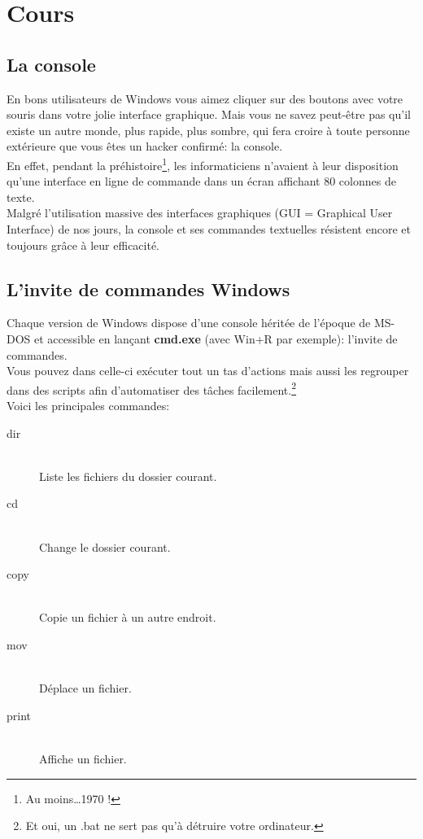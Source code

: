 \section{Cours}

\subsection{La console}
En bons utilisateurs de Windows vous aimez cliquer sur des boutons avec votre
souris dans votre jolie interface graphique. Mais vous ne savez peut-être pas
qu'il existe un autre monde, plus rapide, plus sombre, qui fera croire à toute
personne extérieure que vous êtes un hacker confirmé: la console.\\
En effet, pendant la préhistoire\footnote{Au moins\ldots 1970 !}, les
informaticiens n'avaient à leur disposition qu'une interface en ligne de
commande dans un écran affichant 80 colonnes de texte.\\
Malgré l'utilisation massive des interfaces graphiques (GUI = Graphical User
Interface) de nos jours, la console et ses commandes textuelles résistent encore
et toujours grâce à leur efficacité.

\subsection{L'invite de commandes Windows}
Chaque version de Windows dispose d'une console héritée de l'époque de MS-DOS
et accessible en lançant \textbf{cmd.exe} (avec Win+R par exemple): l'invite de
commandes.\\
Vous pouvez dans celle-ci exécuter tout un tas d'actions mais aussi les
regrouper dans des scripts afin d'automatiser des tâches
facilement.\footnote{Et oui, un .bat ne sert pas qu'à détruire votre
ordinateur.}\\
Voici les principales commandes:

\begin{description}
    \item[dir] \hfill \\
        Liste les fichiers du dossier courant.
    \item[cd] \hfill \\
        Change le dossier courant.
    \item[copy] \hfill \\
        Copie un fichier à un autre endroit.
    \item[mov] \hfill \\
        Déplace un fichier.
    \item[print] \hfill \\
        Affiche un fichier.
\end{description}


